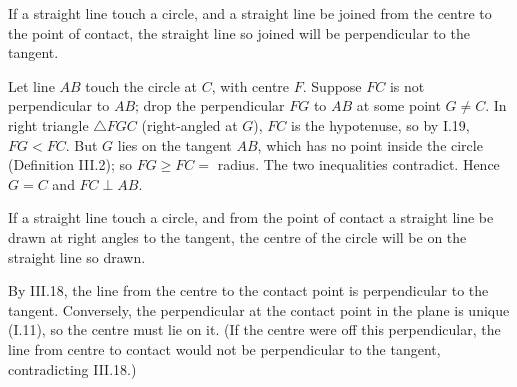 \documentclass{rrxiv}
\begin{document}
\begin{claim}
\label{prop:III.18}
If a straight line touch a circle, and a straight line be joined
from the centre to the point of contact, the straight line so joined
will be perpendicular to the tangent.
\end{claim}
\begin{evidence}
\label{ev:III.18}
Let line $AB$ touch the circle at $C$, with centre $F$.  Suppose $FC$
is not perpendicular to $AB$; drop the perpendicular $FG$ to $AB$
at some point $G \neq C$.  In right triangle $\triangle FGC$
(right-angled at $G$), $FC$ is the hypotenuse, so by I.19, $FG <
FC$.  But $G$ lies on the tangent $AB$, which has no point inside
the circle (Definition III.2); so $FG \geq FC = $ radius.  The two
inequalities contradict.  Hence $G = C$ and $FC \perp AB$.
\end{evidence}

\begin{claim}
\label{prop:III.19}
If a straight line touch a circle, and from the point of contact a
straight line be drawn at right angles to the tangent, the centre of
the circle will be on the straight line so drawn.
\end{claim}
\begin{evidence}
\label{ev:III.19}
By III.18, the line from the centre to the contact point is
perpendicular to the tangent.  Conversely, the perpendicular at the
contact point in the plane is unique (I.11), so the centre must lie
on it.  (If the centre were off this perpendicular, the line from
centre to contact would not be perpendicular to the tangent,
contradicting III.18.)
\end{evidence}
\end{document}
